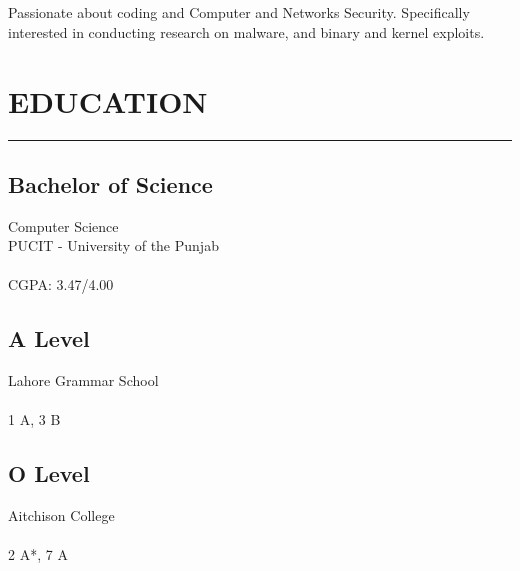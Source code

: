 \documentclass[]{resume}
\begin{document}
%
%

\begin{minipage}[t]{0.33\textwidth}

    \begin{large}
        \\
    \end{large}

    \vspace{4pt}
    \noindent {}\\
    Passionate about coding and Computer and Networks Security. Specifically interested in conducting research on malware, and binary and kernel exploits.



    \section{EDUCATION}
    \noindent\rule{5 cm}{0.4pt}

    \subsection{Bachelor of Science}
    \noindent Computer Science\\
    PUCIT - University of the Punjab\\
    \\
    CGPA: 3.47/4.00

    \vspace{8pt}
    \subsection{A Level}
    \noindent Lahore Grammar School\\
    \\
    1 A, 3 B

    \vspace{8pt}
    \subsection{O Level}
    \noindent Aitchison College\\
    \\
    2 A*, 7 A


\end{minipage}
\end{document}
